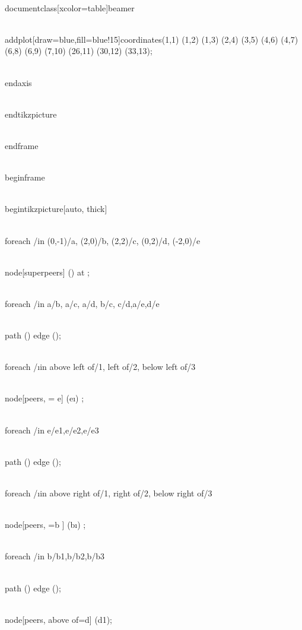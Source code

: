 \\documentclass[xcolor=table]{beamer}
\begin{document}
\\addplot[draw=blue,fill=blue!15]coordinates{(1,1) (1,2) (1,3) (2,4) (3,5) (4,6) (4,7) (6,8) (6,9) (7,10) (26,11) (30,12) (33,13)};

\\end{axis}

\\end{tikzpicture}

\\end{frame}

\\begin{frame}

\\begin{tikzpicture}[auto, thick]


\\foreach \place/\name in {{(0,-1)/a}, {(2,0)/b}, {(2,2)/c}, {(0,2)/d}, {(-2,0)/e}}

\\node[superpeers] (\name) at \place {};

\\foreach \source/\dest in {a/b, a/c, a/d, b/c, c/d,a/e,d/e}

\\path (\source) edge (\dest);

%


\\foreach \pos/\i in {above left of/1, left of/2, below left of/3}

\\node[peers, \pos = e] (e\i) {};

\\foreach \speer/\peer in {e/e1,e/e2,e/e3}

\\path (\speer) edge (\peer);

%

\\foreach \pos/\i in {above right of/1, right of/2, below right of/3}

\\node[peers, \pos =b ] (b\i) {};

\\foreach \speer/\peer in {b/b1,b/b2,b/b3}

\\path (\speer) edge (\peer);

%

\\node[peers, above of=d] (d1){};
\end{document}
